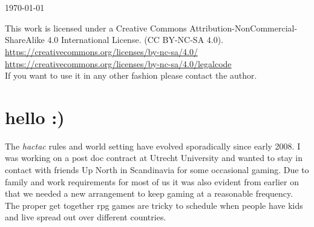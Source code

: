 \documentclass[11pt, twoside, titlepage, a4paper]{report}
\renewcommand{\chaptermark}[1]{\markboth{#1}{}}
\begin{document}
\begin{titlepage}
\begin{center}
   \vfill %


   \ %



   \ %

   \normalsize{\today}

\end{center}


\end{titlepage}




\raggedbottom

This work is licensed under a Creative Commons Attribution-NonCommercial-ShareAlike 4.0 International License. (CC BY-NC-SA 4.0).\\
\url{https://creativecommons.org/licenses/by-nc-sa/4.0/} \\
\url{https://creativecommons.org/licenses/by-nc-sa/4.0/legalcode} \\
If you want to use it in any other fashion please contact the author.






\cleardoublepage %
\raggedbottom

\chaptermark{hello}
\chapter*{hello :)}

The \emph{hactac} rules and world setting have evolved sporadically since early 2008. I was working on a post doc contract at Utrecht University and wanted to stay in contact with friends Up North in Scandinavia for some occasional gaming. Due to family and work requirements for most of us it was also evident from earlier on that we needed a new arrangement to keep gaming at a reasonable frequency. The proper get together rpg games are tricky to schedule when people have kids and live spread out over different countries.
\end{document}
